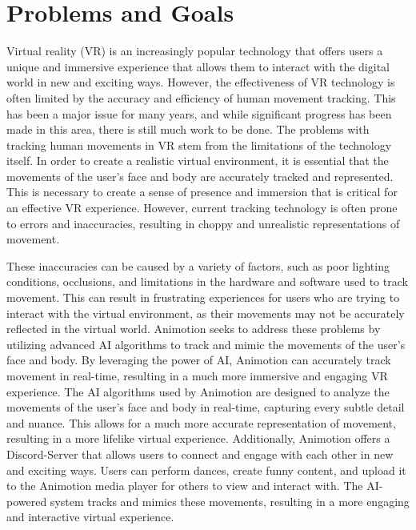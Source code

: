 \section{Problems and Goals}
Virtual reality (VR) is an increasingly popular technology that offers users a unique and immersive experience that allows them to interact with 
the digital world in new and exciting ways. However, the effectiveness of VR technology is often limited by the accuracy and efficiency of human 
movement tracking. This has been a major issue for many years, and while significant progress has been made in this area, there is still much 
work to be done. The problems with tracking human movements in VR stem from the limitations of the technology itself. In order to create a realistic virtual 
environment, it is essential that the movements of the user's face and body are accurately tracked and represented. This is necessary to 
create a sense of presence and immersion that is critical for an effective VR experience. However, current tracking technology is often prone 
to errors and inaccuracies, resulting in choppy and unrealistic representations of movement.

These inaccuracies can be caused by a variety of factors, such as poor lighting conditions, occlusions, and limitations in the 
hardware and software used to track movement. This can result in frustrating experiences for users who are trying to interact 
with the virtual environment, as their movements may not be accurately reflected in the virtual world.
Animotion seeks to address these problems by utilizing advanced AI algorithms to track and mimic the movements of the user's 
face and body. By leveraging the power of AI, Animotion can accurately track movement in real-time, resulting in a much more 
immersive and engaging VR experience. The AI algorithms used by Animotion are designed to analyze the movements of the user's face and body in real-time, capturing every 
subtle detail and nuance. This allows for a much more accurate representation of movement, resulting in a more lifelike virtual experience.
Additionally, Animotion offers a Discord-Server that allows users to connect and engage with each other in new and exciting ways. 
Users can perform dances, create funny content, and upload it to the Animotion media player for others to view and interact with. 
The AI-powered system tracks and mimics these movements, resulting in a more engaging and interactive virtual experience.
